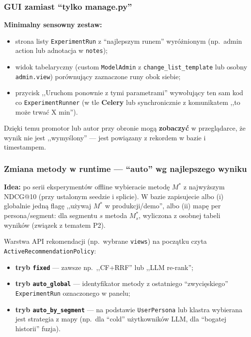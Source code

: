 \documentclass[a4paper,11pt]{article}
\newcommand{\code}[1]{\texttt{\small #1}}
\begin{document}
\subsubsection{GUI zamiast ``tylko manage.py''}

\textbf{Minimalny sensowny zestaw:}
\begin{itemize}[leftmargin=1.5em,itemsep=2pt]
  \item strona listy \code{ExperimentRun} z ``najlepszym runem'' wyróżnionym (np.\ admin action lub adnotacja w \code{notes});
  \item widok tabelaryczny (custom \code{ModelAdmin} z \code{change\_list\_template} lub osobny \code{admin.view}) porównujący zaznaczone runy obok siebie;
  \item przycisk ,,Uruchom ponownie z tymi parametrami'' wywołujący ten sam kod co \code{ExperimentRunner} (w tle \textbf{Celery} lub synchronicznie z komunikatem ,,to może trwać X min'').
\end{itemize}

Dzięki temu promotor lub autor przy obronie mogą \textbf{zobaczyć} w przeglądarce, że wynik nie jest ,,wymyślony'' --- jest powiązany z rekordem w bazie i timestampem.

\subsubsection{Zmiana metody w runtime --- ``auto'' wg najlepszego wyniku}

\textbf{Idea:} po serii eksperymentów offline wybieracie metodę $M^\ast$ z najwyższym NDCG@10 (przy ustalonym seedzie i splicie). W bazie zapisujecie albo (i) globalnie jedną flagę ,,używaj $M^\ast$ w produkcji/demo'', albo (ii) mapę per persona/segment: dla segmentu $s$ metoda $M_s^\ast$, wyliczona z osobnej tabeli wyników (związek z tematem P2).

Warstwa API rekomendacji (np.\ wybrane \code{views}) na początku czyta \code{ActiveRecommendationPolicy}:
\begin{itemize}[leftmargin=1.5em,itemsep=2pt]
  \item \textbf{tryb \texttt{fixed}} --- zawsze np.\ ,,CF+RRF'' lub ,,LLM re-rank'';
  \item \textbf{tryb \texttt{auto\_global}} --- identyfikator metody z ostatniego ``zwycięskiego'' \code{ExperimentRun} oznaczonego w panelu;
  \item \textbf{tryb \texttt{auto\_by\_segment}} --- na podstawie \code{UserPersona} lub klastra wybierana jest strategia z mapy (np.\ dla ``cold'' użytkowników LLM, dla ``bogatej historii'' fuzja).
\end{itemize}
\end{document}
